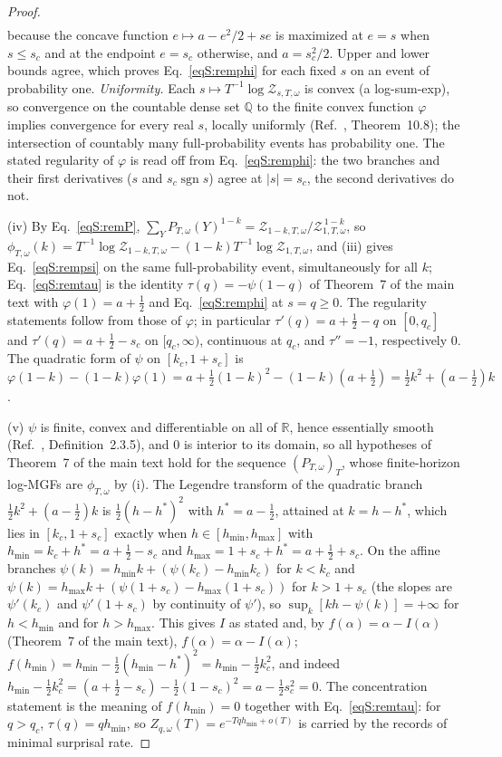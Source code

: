 \documentclass[aps,prx,reprint,superscriptaddress,nobibnotes,longbibliography]{revtex4-2}
\begin{document}
\begin{proof}
\begin{align*}
\end{align*}
because the concave function $e\mapsto a-e^2/2+se$ is maximized at $e=s$
when $s\le s_c$ and at the endpoint $e=s_c$ otherwise, and $a=s_c^2/2$.
Upper and lower bounds agree, which proves Eq.~\eqref{eqS:remphi} for
each fixed $s$ on an event of probability one.  \emph{Uniformity.}  Each
$s\mapsto T^{-1}\log\mathcal Z_{s,T,\omega}$ is convex (a log-sum-exp),
so convergence on the countable dense set $\mathbb Q$ to the finite
convex function $\varphi$ implies convergence for every real $s$, locally
uniformly (Ref.~\cite{Rockafellar1970}, Theorem~10.8); the intersection
of countably many full-probability events has probability one.  The
stated regularity of $\varphi$ is read off from Eq.~\eqref{eqS:remphi}:
the two branches and their first derivatives ($s$ and
$s_c\operatorname{sgn}s$) agree at $|s|=s_c$, the second derivatives do
not.

(iv) By Eq.~\eqref{eqS:remP},
$\sum_YP_{T,\omega}(Y)^{1-k}
=\mathcal Z_{1-k,T,\omega}/\mathcal Z_{1,T,\omega}^{\,1-k}$, so
$\phi_{T,\omega}(k)=T^{-1}\log\mathcal Z_{1-k,T,\omega}
-(1-k)T^{-1}\log\mathcal Z_{1,T,\omega}$, and (iii) gives
Eq.~\eqref{eqS:rempsi} on the same full-probability event,
simultaneously for all $k$; Eq.~\eqref{eqS:remtau} is the identity
$\tau(q)=-\psi(1-q)$ of Theorem~7 of the main text with $\varphi(1)
=a+\tfrac12$ and Eq.~\eqref{eqS:remphi} at $s=q\ge0$.  The regularity
statements follow from those of $\varphi$; in particular
$\tau'(q)=a+\tfrac12-q$ on $[0,q_c]$ and $\tau'(q)=a+\tfrac12-s_c$ on
$[q_c,\infty)$, continuous at $q_c$, and $\tau''=-1$, respectively $0$.
The quadratic form of $\psi$ on $[k_c,1+s_c]$ is
$\varphi(1-k)-(1-k)\varphi(1)=a+\tfrac12(1-k)^2-(1-k)(a+\tfrac12)
=\tfrac12k^2+(a-\tfrac12)k$.

(v) $\psi$ is finite, convex and differentiable on all of $\mathbb R$,
hence essentially smooth (Ref.~\cite{DemboZeitouni1998},
Definition~2.3.5), and $0$ is interior to its domain, so all hypotheses
of Theorem~7 of the main text hold for the sequence $(P_{T,\omega})_T$,
whose finite-horizon log-MGFs are $\phi_{T,\omega}$ by (i).  The
Legendre transform of the quadratic branch $\tfrac12k^2+(a-\tfrac12)k$
is $\tfrac12(h-h^*)^2$ with $h^*=a-\tfrac12$, attained at $k=h-h^*$,
which lies in $[k_c,1+s_c]$ exactly when $h\in[h_{\min},h_{\max}]$ with
$h_{\min}=k_c+h^*=a+\tfrac12-s_c$ and $h_{\max}=1+s_c+h^*=a+\tfrac12+s_c$.
On the affine branches $\psi(k)=h_{\min}k+(\psi(k_c)-h_{\min}k_c)$ for
$k<k_c$ and $\psi(k)=h_{\max}k+(\psi(1+s_c)-h_{\max}(1+s_c))$ for
$k>1+s_c$ (the slopes are $\psi'(k_c)$ and $\psi'(1+s_c)$ by continuity
of $\psi'$), so $\sup_k[kh-\psi(k)]=+\infty$ for $h<h_{\min}$ and for
$h>h_{\max}$.  This gives $I$ as stated and, by
$f(\alpha)=\alpha-I(\alpha)$ (Theorem~7 of the main text),
$f(\alpha)=\alpha-I(\alpha)$;
$f(h_{\min})=h_{\min}-\tfrac12(h_{\min}-h^*)^2=h_{\min}-\tfrac12k_c^2$,
and indeed $h_{\min}-\tfrac12k_c^2=(a+\tfrac12-s_c)-\tfrac12(1-s_c)^2
=a-\tfrac12s_c^2=0$.  The concentration statement is the meaning of
$f(h_{\min})=0$ together with Eq.~\eqref{eqS:remtau}: for $q>q_c$,
$\tau(q)=qh_{\min}$, so $Z_{q,\omega}(T)=e^{-Tqh_{\min}+o(T)}$ is
carried by the records of minimal surprisal rate.
\end{proof}
\end{document}
